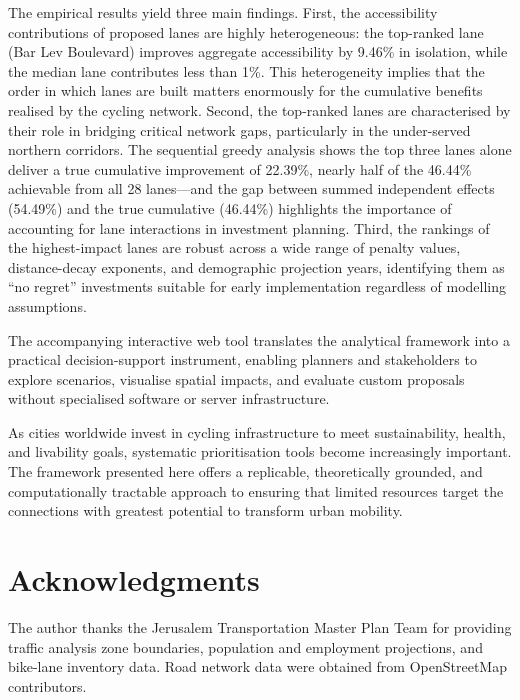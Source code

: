\documentclass[12pt,a4paper]{article}
\begin{document}
The empirical results yield three main findings. First, the accessibility contributions of proposed lanes are highly heterogeneous: the top-ranked lane (Bar Lev Boulevard) improves aggregate accessibility by 9.46\% in isolation, while the median lane contributes less than 1\%. This heterogeneity implies that the order in which lanes are built matters enormously for the cumulative benefits realised by the cycling network. Second, the top-ranked lanes are characterised by their role in bridging critical network gaps, particularly in the under-served northern corridors. The sequential greedy analysis shows the top three lanes alone deliver a true cumulative improvement of 22.39\%, nearly half of the 46.44\% achievable from all 28 lanes---and the gap between summed independent effects (54.49\%) and the true cumulative (46.44\%) highlights the importance of accounting for lane interactions in investment planning. Third, the rankings of the highest-impact lanes are robust across a wide range of penalty values, distance-decay exponents, and demographic projection years, identifying them as ``no regret'' investments suitable for early implementation regardless of modelling assumptions.

The accompanying interactive web tool translates the analytical framework into a practical decision-support instrument, enabling planners and stakeholders to explore scenarios, visualise spatial impacts, and evaluate custom proposals without specialised software or server infrastructure.

As cities worldwide invest in cycling infrastructure to meet sustainability, health, and livability goals, systematic prioritisation tools become increasingly important. The framework presented here offers a replicable, theoretically grounded, and computationally tractable approach to ensuring that limited resources target the connections with greatest potential to transform urban mobility.

\section*{Acknowledgments}

The author thanks the Jerusalem Transportation Master Plan Team for providing traffic analysis zone boundaries, population and employment projections, and bike-lane inventory data. Road network data were obtained from OpenStreetMap contributors.
\end{document}
